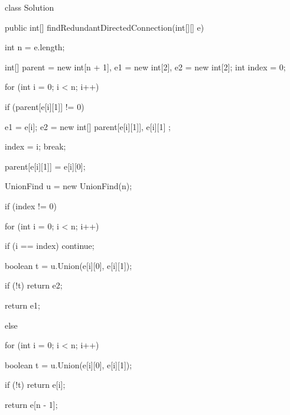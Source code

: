 		class Solution {
		
			public int[] findRedundantDirectedConnection(int[][] e) {
		
				int n = e.length;
		
				int[] parent = new int[n + 1], e1 = new int[2], e2 = new int[2];
				int index = 0;
		
				for (int i = 0; i < n; i++) {
		
					if (parent[e[i][1]] != 0) {
						e1 = e[i];
						e2 = new int[] { parent[e[i][1]], e[i][1] };
		
						index = i;
						break;
					}
		
					parent[e[i][1]] = e[i][0];
				}
		
				UnionFind u = new UnionFind(n);
		
				if (index != 0) {
					for (int i = 0; i < n; i++) {
						if (i == index)
							continue;
		
						boolean t = u.Union(e[i][0], e[i][1]);
		
						if (!t)
							return e2;
					}
		
					return e1;
				}
		
				else {
					for (int i = 0; i < n; i++) {
						boolean t = u.Union(e[i][0], e[i][1]);
		
						if (!t)
							return e[i];
					}
				}
				return e[n - 1];
			}
		
		}